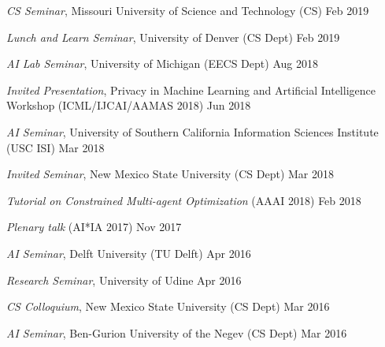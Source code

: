 	\item {\it CS Seminar}, Missouri University of Science and Technology (CS)
	\hfill {Feb 2019}

	\item {\it Lunch and Learn Seminar}, University of Denver (CS Dept)
	\hfill {Feb 2019}

	\item {\it AI Lab Seminar}, University of Michigan (EECS Dept)
	\hfill {Aug 2018}

	\item {\it Invited Presentation}, 
	Privacy in Machine Learning and Artificial Intelligence Workshop 
	(ICML/IJCAI/AAMAS 2018)
	\hfill {Jun 2018}

	\item {\it AI Seminar}, University of Southern California Information Sciences Institute (USC ISI)
	\hfill {Mar 2018}

	\item {\it Invited Seminar}, New Mexico State University (CS Dept)
	\hfill {Mar 2018}

	\item {\it Tutorial on Constrained Multi-agent Optimization} (AAAI 2018)
	\hfill {Feb 2018}

	\item {\it Plenary talk} (AI*IA 2017)
	\hfill {Nov 2017}

	\item {\it AI Seminar}, Delft University (TU Delft)
	\hfill {Apr 2016} 

	\item {\it Research Seminar}, University of Udine
	\hfill {Apr 2016} 
	 
	\item {\it CS Colloquium}, New Mexico State University (CS Dept)
	\hfill {Mar 2016}
	
	\item {\it AI Seminar}, Ben-Gurion University of the Negev (CS Dept)
	\hfill {Mar 2016}
\endList